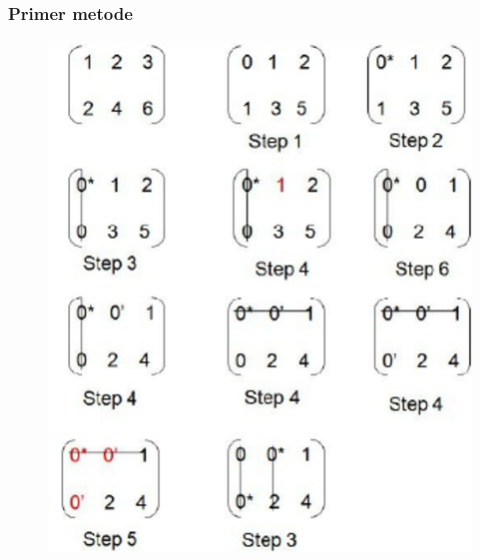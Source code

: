 \documentclass{beamer}
\begin{document}
\begin{frame}
    \frametitle{Primer metode}
        \begin{figure}[htbp]
            \centerline{\includegraphics[scale=0.20]{Kuhn-Munkres-example.png}}
        \end{figure}
\end{frame}
\end{document}
